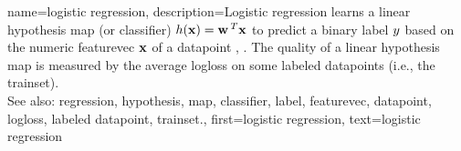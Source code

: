 {name={logistic regression}, 
	description={Logistic \gls{regression} learns a 
		linear \gls{hypothesis} \gls{map} (or \gls{classifier}) $h({\bf x}) = {\bf w}\,^{T} {\bf x}$ 
		to predict a binary \gls{label} $y$ based on the numeric 
		\gls{featurevec} ${\bf x}$ of a \gls{datapoint} \cite{BishopBook}, \cite{hastie01statisticallearning}. 
		The quality of a linear \gls{hypothesis} \gls{map} is measured by the average \gls{logloss} 
		on some \glspl{labeled datapoint} (i.e., the \gls{trainset}).
				\\
		See also: \gls{regression}, \gls{hypothesis}, \gls{map}, \gls{classifier}, \gls{label}, \gls{featurevec}, \gls{datapoint}, \gls{logloss}, \gls{labeled datapoint}, \gls{trainset}.},
	first={logistic regression},
	text={logistic regression}
}
	
